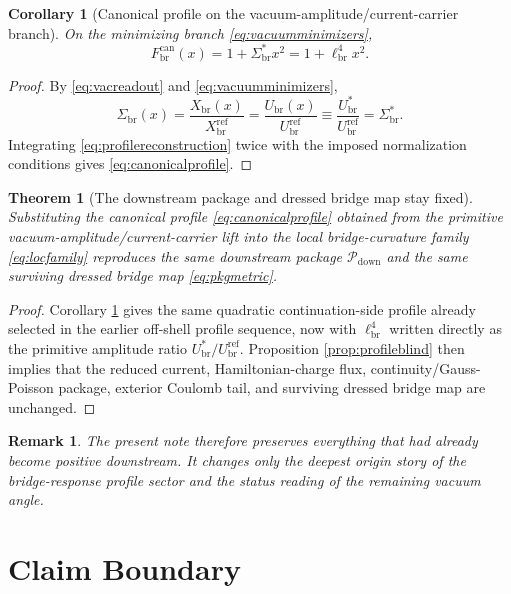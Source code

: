 \documentclass[11pt]{article}
\newcommand{\CurvScale}{\ell_{\mathrm{br}}}
\newcommand{\CurvProfileCan}{F_{\mathrm{br}}^{\mathrm{can}}}
\newcommand{\DownPkg}{\mathscr P_{\mathrm{down}}}
\newcommand{\RespSus}{\Sigma_{\mathrm{br}}}
\newcommand{\RespSusEq}{\Sigma_{\mathrm{br}}^{\ast}}
\newcommand{\RespMicro}{X_{\mathrm{br}}}
\newcommand{\RespMicroRef}{X_{\mathrm{br}}^{\mathrm{ref}}}
\newcommand{\RespVacAmp}{U_{\mathrm{br}}}
\newcommand{\RespVacRef}{U_{\mathrm{br}}^{\mathrm{ref}}}
\newcommand{\RespVacEq}{U_{\mathrm{br}}^{\ast}}
\newtheorem{remark}{Remark}
\newtheorem{corollary}{Corollary}
\newtheorem{theorem}{Theorem}
\begin{document}
\begin{corollary}[Canonical profile on the vacuum-amplitude/current-carrier branch]
\label{cor:canonicalprofile}
On the minimizing branch \eqref{eq:vacuumminimizers},
\begin{equation}
\CurvProfileCan(x)=1+\RespSusEq x^2=1+\CurvScale^4x^2.
\label{eq:canonicalprofile}
\end{equation}
\end{corollary}

\begin{proof}
By \eqref{eq:vacreadout} and \eqref{eq:vacuumminimizers},
\[
\RespSus(x)=\frac{\RespMicro(x)}{\RespMicroRef}
=
\frac{\RespVacAmp(x)}{\RespVacRef}
\equiv
\frac{\RespVacEq}{\RespVacRef}
=
\RespSusEq.
\]
Integrating \eqref{eq:profilereconstruction} twice with the imposed normalization conditions gives \eqref{eq:canonicalprofile}.
\end{proof}

\begin{theorem}[The downstream package and dressed bridge map stay fixed]
\label{thm:fixedpackage}
Substituting the canonical profile \eqref{eq:canonicalprofile} obtained from the primitive vacuum-amplitude/current-carrier lift into the local bridge-curvature family \eqref{eq:locfamily} reproduces the same downstream package \(\DownPkg\) and the same surviving dressed bridge map \eqref{eq:pkgmetric}.
\end{theorem}

\begin{proof}
Corollary \ref{cor:canonicalprofile} gives the same quadratic continuation-side profile already selected in the earlier off-shell profile sequence, now with \(\CurvScale^4\) written directly as the primitive amplitude ratio \(\RespVacEq/\RespVacRef\). Proposition \ref{prop:profileblind} then implies that the reduced current, Hamiltonian-charge flux, continuity/Gauss-Poisson package, exterior Coulomb tail, and surviving dressed bridge map are unchanged.
\end{proof}

\begin{remark}
The present note therefore preserves everything that had already become positive downstream. It changes only the deepest origin story of the bridge-response profile sector and the status reading of the remaining vacuum angle.
\end{remark}

\section{Claim Boundary}
\end{document}
